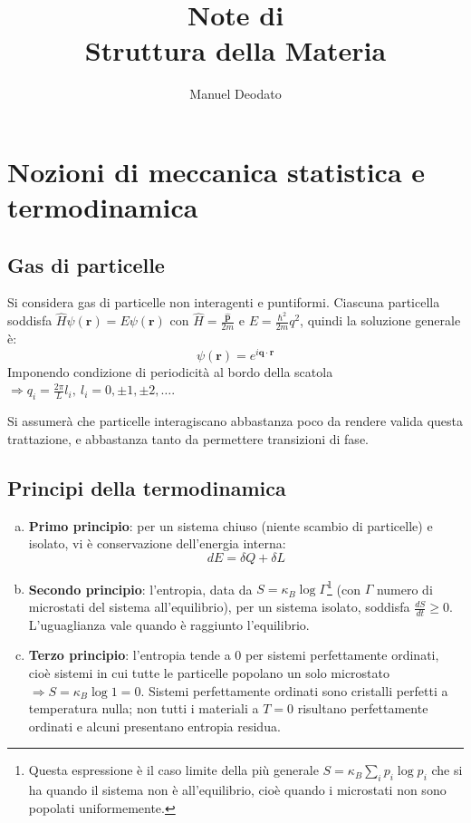 \documentclass[10pt, a4paper]{scrartcl}
\title{Note di\\\vspace{.2cm} Struttura della Materia}
\author{Manuel Deodato}
\date{}
\renewcommand{\maketitle}{
\begin{center}
{\sffamily
{\fontsize{20}{20}\selectfont\MakeUppercase\thetitle}}

\vspace{0.2in}

{\large\scshape\sffamily\theauthor}
\end{center}
}
\numberwithin{equation}{subsection}
\theoremstyle{style1}
\begin{document}
\maketitle
\newpage
\tableofcontents 
\newpage
\section{Nozioni di meccanica statistica e termodinamica}

\subsection{Gas di particelle}


Si considera gas di particelle non interagenti e puntiformi. Ciascuna particella soddisfa $\hat{H}\psi (\mathbf{r} ) = E  \psi (\mathbf{r} )$ con $\hat{H} = \frac{\hat{\mathbf{p} }}{2m}$ e $E = \frac{\hbar ^2}{2m} q ^2 $, quindi la soluzione generale \`e:
\begin{equation}
	\psi (\mathbf{r} ) = e^{ i \mathbf{q} \cdot \mathbf{r} } 
\end{equation}
Imponendo condizione di periodicit\`a al bordo della scatola $\Rightarrow q_i = \frac{2\pi}{L}l_i, \ l_i = 0, \pm 1,\pm 2,\ldots$. 

Si assumer\`a che particelle interagiscano abbastanza poco da rendere valida questa trattazione, e abbastanza tanto da permettere transizioni di fase.
\subsection{Principi della termodinamica}
\begin{enumerate}[(a).]
	\item \textbf{Primo principio}: per un sistema chiuso (niente scambio di particelle) e isolato, vi \`e conservazione dell'energia interna:
		\begin{equation}
			dE = \delta  Q + \delta L
		\end{equation}
	\item \textbf{Secondo principio}: l'entropia, data da $S = \kappa _B \log \Gamma$\footnote{Questa espressione \`e il caso limite della pi\`u generale $S = \kappa _B \sum_{i}^{} p_i \log p_i$ che si ha quando il sistema non \`e all'equilibrio, cio\`e quando i microstati non sono popolati uniformemente.} (con $\Gamma$ numero di microstati del sistema all'equilibrio), per un sistema isolato, soddisfa $\frac{d S}{d t} \ge 0$. L'uguaglianza vale quando \`e raggiunto l'equilibrio.
	\item \textbf{Terzo principio}: l'entropia tende a $0$ per sistemi perfettamente ordinati, cio\`e sistemi in cui tutte le particelle popolano un solo microstato $\Rightarrow S = \kappa _B \log 1 = 0$. Sistemi perfettamente ordinati sono cristalli perfetti a temperatura nulla; non tutti i materiali a $T=0$ risultano perfettamente ordinati e alcuni presentano entropia residua.
\end{enumerate}
\end{document}
